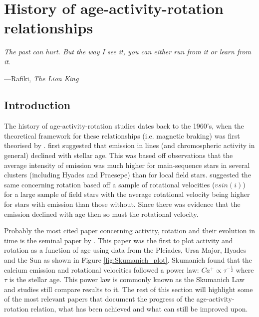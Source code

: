
\chapter{History of age-activity-rotation relationships} %

\label{Chapter2} %


\epigraph{\itshape The past can hurt. But the way I see it, you can either run from it or learn from it.}{---Rafiki, \textit{The Lion King}}

\section{Introduction}

The history of age-activity-rotation studies dates back to the 1960's, when the theoretical framework for these relationships (i.e. magnetic braking) was first theorised by \citet{Schatzman_1962}. \citet{Wilson_1963} first suggested that emission in \caII lines (and chromospheric activity in general) declined with stellar age. This was based off observations that the average intensity of \caII emission was much higher for main-sequence stars in several clusters (including Hyades and Praesepe) than for local field stars. \citet{Kraft_1967} suggested the same concerning rotation based off a sample of rotational velocities ($vsin(i)$) for a large sample of field stars with the average rotational velocity being higher for stars with \caII emission than those without. Since there was evidence that the \caII emission declined with age then so must the rotational velocity.

Probably the most cited paper concerning activity, rotation and their evolution in time is the seminal paper by \citet{Skumanich_1972}. This paper was the first to plot activity and rotation as a function of age using data from the Pleiades, Ursa Major, Hyades and the Sun as shown in Figure \ref{fig:Skumanich_plot}. Skumanich found that the calcium emission and rotational velocities followed a power law: $Ca^{+} \propto \tau^{-\frac{1}{2}}$ where $\tau$ is the stellar age. This power law is commonly known as the Skumanich Law and studies still compare results to it. The rest of this section will highlight some of the most relevant papers that document the progress of the age-activity-rotation relation, what has been achieved and what can still be improved upon.

